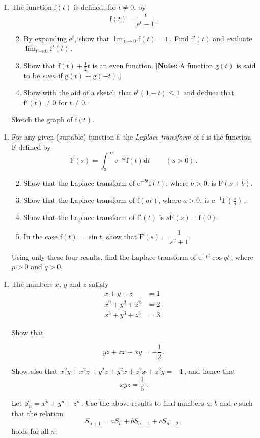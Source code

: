 \documentclass[a4, 11pt]{report}
\newlength{\qspace}
\newcounter{qnumber}
\newenvironment{question}%
 {\vspace{\qspace}
  \begin{enumerate}[\bfseries 1\quad][10]%
    \setcounter{enumi}{\value{qnumber}}%
    \item%
 }
{
  \end{enumerate}
  \filbreak
  \stepcounter{qnumber}
 }
\newenvironment{questionparts}[1][1]%
 {
  \begin{enumerate}[\bfseries (i)]%
    \setcounter{enumii}{#1}
    \addtocounter{enumii}{-1}
    \setlength{\itemsep}{5mm}
    \setlength{\parskip}{8pt}
 }
 {
  \end{enumerate}
 }
\def\d{{\mathrm d}}
\def\e{{\mathrm e}}
\def\g{{\mathrm g}}
\def\f{{\mathrm f}}
\def\F{{\mathrm F}}
\def\le{\leqslant}
\begin{document}
\begin{question}
The function $\f(t)$ is defined, for $t\ne0$, by 
\[
\f(t)  = \frac t {\e^t-1}\,.
\]
 
 \begin{questionparts}

\item 
By expanding $\e^t$, show that 
 $\displaystyle \lim _{t\to0} \f(t) = 1\,$.
 Find $\f'(t)$ and evaluate
 $\displaystyle  \lim _{t\to0} \f'(t)\,$.

\item
 Show that $\f(t) +\frac12 t$ is an even function.
[{\bf Note:} A function $\g(t)$ is said to be {\em even}
if $\g(t) \equiv  \g(-t)$.]

\item 
Show with the aid of a sketch that $ \e^t(  1-t)\le 1\,$
and deduce that $\f'(t)\ne 0$ for $t\ne0$.

\end{questionparts}

Sketch the graph of $\f(t)$.
\end{question}

\begin{question}
For any given (suitable) function $\f$, the {\sl Laplace transform}
of $\f$ is the function $\F$ defined by
\[
\F(s) = \int_0^\infty \e^{-st}\f(t)\d t
\ \ \ \ \ \ \ \ \ \ (s>0)
\,.
\]

\begin{questionparts}
\item
Show that the Laplace transform of $\e^{-bt}\f(t)$, where $b>0$,
is $\F(s+b)$. 
\item Show that 
the Laplace transform of $\f(at)$, where $a>0$, is $a^{-1}\F(\frac s a)\,$.
\item   Show that the Laplace
transform of $\f'(t)$ is $s\F(s) -\f(0)\,$.
\item
In the case $\f(t)=\sin t$, show that $\F(s)= \dfrac 1 {s^2+1}\,$.
\end{questionparts}

Using only these four results, find the Laplace transform of 
$\e^{-pt}\cos{qt}\,$, where $p>0$ and $q>0$.
\end{question}

\begin{question}
The numbers $x$, $y$ and $z$ satisfy
\begin{align*}
x+y+z&= 1\\
x^2+y^2+z^2&=2\\
x^3+y^3+z^3&=3\,.
\end{align*}

Show that

\[
yz+zx+xy=-\frac12 \,.\]

Show also that $x^2y+x^2z+y^2z+y^2x+z^2x+z^2y=-1\,$,
and hence that
 \[
 xyz=\frac16 \,.\]

Let $S_n=x^n+y^n+z^n\,$.
Use the above results to 
find numbers $a$, $b$ and $c$
such that the relation 
\[
S_{n+1}=aS_{n}+bS_{n-1}+cS_{n-2}\,,
\]
holds for all $n$.
	\end{question}
	
\end{document}
